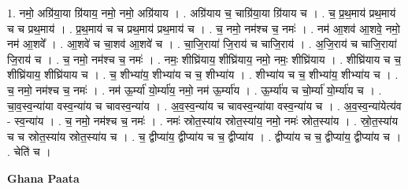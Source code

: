 \documentclass[17pt]{extarticle}
\begin{document}
1. नमो॒ अग्रि॑या॒या ग्रि॑याय॒ नमो॒ नमो॒ अग्रि॑याय । . अग्रि॑याय च॒ चाग्रि॑या॒या ग्रि॑याय च । . च॒ प्र॒थ॒माय॑ प्रथ॒माय॑ च च प्रथ॒माय॑ । . प्र॒थ॒माय॑ च च प्रथ॒माय॑ प्रथ॒माय॑ च । . च॒ नमो॒ नम॑श्च च॒ नमः॑ । . नम॑ आ॒शव॑ आ॒शवे॒ नमो॒ नम॑ आ॒शवे᳚ । . आ॒शवे॑ च चा॒शव॑ आ॒शवे॑ च । . चा॒जि॒राया॑ जि॒राय॑ च चाजि॒राय॑ । . अ॒जि॒राय॑ च चाजि॒राया॑ जि॒राय॑ च । . च॒ नमो॒ नम॑श्च च॒ नमः॑ । . नमः॒ शीघ्रि॑याय॒ शीघ्रि॑याय॒ नमो॒ नमः॒ शीघ्रि॑याय । . शीघ्रि॑याय च च॒ शीघ्रि॑याय॒ शीघ्रि॑याय च । . च॒ शीभ्या॑य॒ शीभ्या॑य च च॒ शीभ्या॑य । . शीभ्या॑य च च॒ शीभ्या॑य॒ शीभ्या॑य च । . च॒ नमो॒ नम॑श्च च॒ नमः॑ । . नम॑ ऊ॒र्म्या॑ यो॒र्म्या॑य॒ नमो॒ नम॑ ऊ॒र्म्या॑य । . ऊ॒र्म्या॑य च चो॒र्म्या॑ यो॒र्म्या॑य च । . चा॒व॒स्व॒न्या॑या वस्व॒न्या॑य च चावस्व॒न्या॑य । . अ॒व॒स्व॒न्या॑य च चावस्व॒न्या॑या वस्व॒न्या॑य च । . अ॒व॒स्व॒न्या॑येत्य॑व - स्व॒न्या॑य । . च॒ नमो॒ नम॑श्च च॒ नमः॑ । . नमः॑ स्रोत॒स्या॑य स्रोत॒स्या॑य॒ नमो॒ नमः॑ स्रोत॒स्या॑य । . स्रो॒त॒स्या॑य च च स्रोत॒स्या॑य स्रोत॒स्या॑य च । . च॒ द्वीप्या॑य॒ द्वीप्या॑य च च॒ द्वीप्या॑य । . द्वीप्या॑य च च॒ द्वीप्या॑य॒ द्वीप्या॑य च । . चेति॑ च । \newline

\textbf{Ghana Paata } \newline
\end{document}
